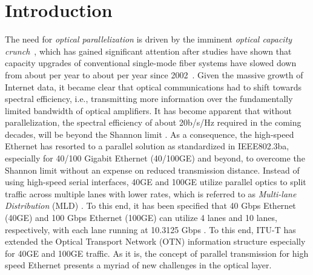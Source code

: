 \documentclass[conference]{IEEEtran}
\begin{document}
\section{Introduction}     
\par The need for \emph{optical parallelization} is driven by the imminent \emph{optical capacity crunch}~\cite{Chralyvy:ecoc:2009}, which has gained significant attention after studies have shown that capacity upgrades of conventional single-mode fiber systems have slowed down from about  per year to about  per year since 2002~\cite{Chralyvy:ecoc:2009}\cite{Winzer:2012}.  Given the massive growth of Internet data, it became clear that optical communications had to shift towards spectral efficiency, i.e., transmitting more information over the fundamentally limited bandwidth of optical amplifiers. It has become apparent that without parallelization, the spectral efficiency of about 20b/s/Hz required in the coming decades, will be beyond the Shannon limit \cite{Winzer:2012}. As a consequence, the high-speed Ethernet has resorted to a parallel solution as standardized in IEEE802.3ba,  especially for 40/100 Gigabit Ethernet (40/100GE) and beyond, to overcome the Shannon limit without 
an expense on reduced transmission distance. Instead of using  high-speed serial interfaces, 40GE and 100GE   utilize 
parallel optics to split traffic across multiple lanes with lower rates, which is referred to as \emph{Multi-lane 
Distribution} (MLD) \cite{802.3ba}. To this end, it has been specified that 40 Gbps Ethernet (40GE) and 100 Gbps 
Ethernet (100GE) can utilize 4 lanes and 10 lanes,  respectively, with each lane running at 10.3125 Gbps 
\cite{802.3ba}. To this end,  ITU-T has extended the Optical Transport Network (OTN) information structure especially 
for 40GE and 100GE traffic.  As it is, the concept of parallel transmission for high speed Ethernet presents  a myriad of 
new challenges in the optical layer. 
\end{document}
